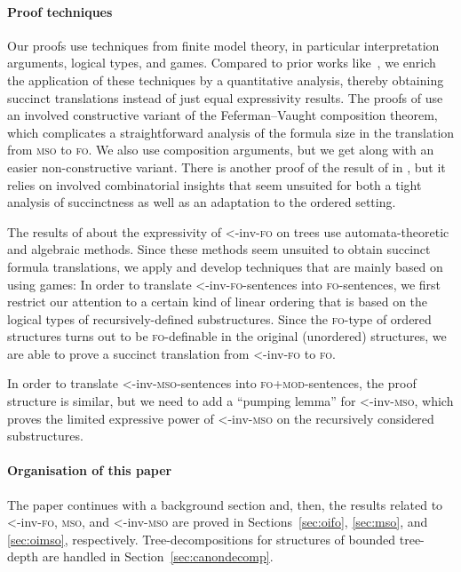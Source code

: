\documentclass[11pt]{article}
\newcommand{\logic}[1]{\textsc{#1}}
\newcommand{\FO}{\logic{fo}}
\newcommand{\FOmod}{\logic{fo+mod}}
\newcommand{\MSO}{\logic{mso}}
\newcommand{\ordinv}[1]{\textnormal{{\small \textless}-inv-}#1}
\newcommand{\oiFO}{\ordinv{\FO{}}}
\newcommand{\oiMSO}{\ordinv{\MSO{}}}
\begin{document}
\paragraph{Proof techniques}

Our proofs use techniques from finite model theory, in particular interpretation
arguments, logical types, and games. Compared to prior works
like~\cite{ElberfeldGT12}, we enrich the application of these techniques by a
quantitative analysis, thereby obtaining succinct translations instead of just
equal expressivity results. The proofs of \cite{ElberfeldGT12} use an involved
constructive variant of the Fefer\-man--Vaught composition theorem, which
complicates a straightforward analysis of the formula size in the translation
from \MSO{} to \FO{}. We also use composition arguments, but we get along with
an easier non-constructive variant. There is another proof of the result of
\cite{ElberfeldGT12} in \cite{GajarskyH2012}, but it relies on involved
combinatorial insights that seem unsuited for both a tight analysis of
succinctness as well as an adaptation to the ordered setting.

The results of \cite{BenediktSegoufin2009} about the expressivity of
\oiFO{} on trees use automata-theoretic and algebraic methods. Since
these methods seem unsuited to obtain succinct formula translations,
we apply and develop techniques that are mainly based on using games:
In order to translate \oiFO-sentences into \FO-sentences, we first
restrict our attention to a certain kind of linear ordering that is
based on the logical types of recursively-defined substructures. Since
the \FO{}-type of ordered structures turns out to be \FO-definable
in the original (unordered) structures,
we are able to prove a
succinct translation from \oiFO{} to \FO.

In order to translate \oiMSO-sentences into \FOmod-sentences, the proof
structure is similar, but we need to add a ``pumping lemma'' for \oiMSO, which
proves the limited expressive power of \oiMSO{} on the recursively considered
substructures.

\paragraph{Organisation of this paper} The paper continues with a background
section and, then, the results related to \oiFO{}, \MSO{}, and \oiMSO{} are
proved in Sections~\ref{sec:oifo}, \ref{sec:mso}, and \ref{sec:oimso},
respectively. Tree-decompositions for structures of bounded tree-depth are
handled in Section~\ref{sec:canondecomp}.
\end{document}
